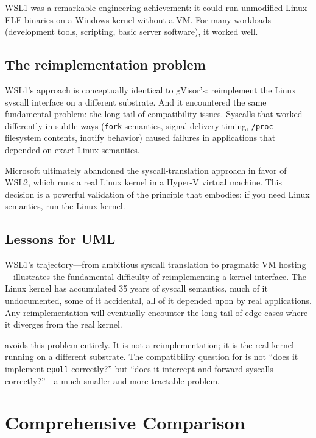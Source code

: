WSL1 was a remarkable engineering achievement: it could run unmodified
Linux ELF binaries on a Windows kernel without a VM.  For many
workloads (development tools, scripting, basic server software),
it worked well.

\subsection{The reimplementation problem}

WSL1's approach is conceptually identical to gVisor's: reimplement
the Linux syscall interface on a different substrate.  And it
encountered the same fundamental problem: the long tail of
compatibility issues.  Syscalls that worked differently in subtle
ways (\texttt{fork} semantics, signal delivery timing,
\texttt{/proc} filesystem contents, inotify behavior) caused
failures in applications that depended on exact Linux semantics.

Microsoft ultimately abandoned the syscall-translation approach in
favor of WSL2, which runs a real Linux kernel in a Hyper-V virtual
machine.  This decision is a powerful validation of the principle
that \UML{} embodies: if you need Linux semantics, run the Linux
kernel.

\subsection{Lessons for UML}

WSL1's trajectory---from ambitious syscall translation to pragmatic
VM hosting---illustrates the fundamental difficulty of reimplementing
a kernel interface.  The Linux kernel has accumulated 35 years of
syscall semantics, much of it undocumented, some of it accidental,
all of it depended upon by real applications.  Any reimplementation
will eventually encounter the long tail of edge cases where it
diverges from the real kernel.

\UML{} avoids this problem entirely.  It is not a reimplementation;
it is the real kernel running on a different substrate.  The
compatibility question for \UML{} is not ``does it implement
\texttt{epoll} correctly?'' but ``does it intercept and forward
syscalls correctly?''---a much smaller and more tractable problem.


\section{Comprehensive Comparison}
\label{sec:related-table}

